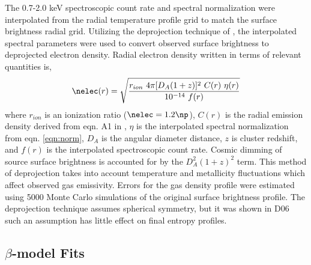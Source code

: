 The 0.7-2.0 keV spectroscopic count rate and spectral normalization
were interpolated from the radial temperature profile grid to match
the surface brightness radial grid. Utilizing the deprojection
technique of \citet{kriss83}, the interpolated spectral parameters were
used to convert observed surface brightness to deprojected electron
density. Radial electron density written in terms of relevant
quantities is,
\begin{equation}
\nelec(r) = \sqrt{\frac{r_{ion}~4 \pi [D_A(1+z)]^2~C(r)~\eta(r)}{10^{-14}~f(r)}}
\end{equation}
where $r_{ion}$ is an ionization ratio ($\nelec=1.2\np$), $C(r)$ is
the radial emission density derived from eqn. A1 in \citet{kriss83},
$\eta$ is the interpolated spectral normalization from
eqn. \ref{eqn:norm}, $D_A$ is the angular diameter distance, $z$ is
cluster redshift, and $f(r)$ is the interpolated spectroscopic count
rate. Cosmic dimming of source surface brightness is accounted for by
the $D_A^2 (1+z)^2$ term. This method of deprojection takes into
account temperature and metallicity fluctuations which affect observed
gas emissivity. Errors for the gas density profile were estimated
using 5000 Monte Carlo simulations of the original surface brightness
profile. The \citet{kriss83} deprojection technique assumes spherical
symmetry, but it was shown in D06 such an assumption has little effect
on final entropy profiles.

\subsection{$\beta$-model Fits}
\label{sec:entsuppbeta}

